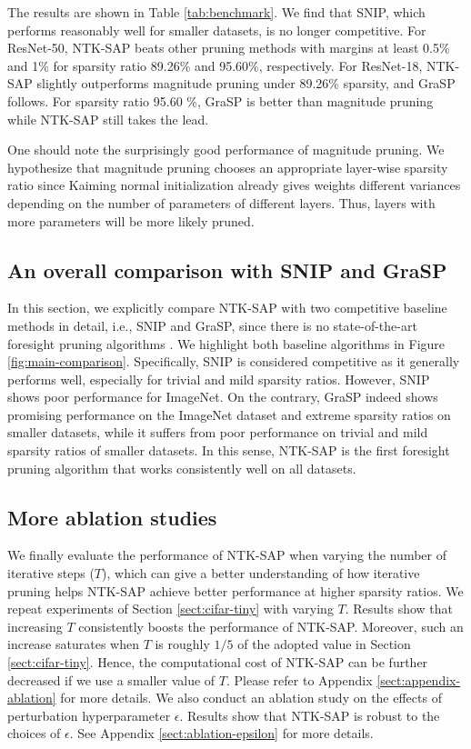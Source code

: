 \documentclass{article} %
\begin{document}
The results are shown in Table \ref{tab:benchmark}. We find that SNIP, which performs reasonably well for smaller datasets, is no longer competitive. For ResNet-50, NTK-SAP beats other pruning methods with margins at least 0.5\% and 1\% for sparsity ratio 89.26\% and 95.60\%, respectively. For ResNet-18, NTK-SAP slightly outperforms magnitude pruning under 89.26\% sparsity, and GraSP follows. For sparsity ratio 95.60 \%, GraSP is better than magnitude pruning while NTK-SAP still takes the lead.


One should note the surprisingly good performance of magnitude pruning. We hypothesize that magnitude pruning chooses an appropriate layer-wise sparsity ratio since Kaiming normal initialization already gives weights different variances depending on the number of parameters of different layers. Thus, layers with more parameters will be more likely pruned. 

\subsection{An overall comparison with SNIP and GraSP}

In this section, we explicitly compare NTK-SAP with two competitive baseline methods in detail, i.e., SNIP and GraSP, since there is no state-of-the-art foresight pruning algorithms \citep{franklemissing}. We highlight both baseline algorithms in Figure \ref{fig:main-comparison}. Specifically, SNIP is considered competitive as it generally performs well, especially for trivial and mild sparsity ratios. However, SNIP shows poor performance for ImageNet. On the contrary, GraSP indeed shows promising performance on the ImageNet dataset and extreme sparsity ratios on smaller datasets, while it suffers from poor performance on trivial and mild sparsity ratios of smaller datasets. In this sense, NTK-SAP is the first foresight pruning algorithm that works consistently well on all datasets.

\subsection{More ablation studies} \label{sect:ablation-T}
We finally evaluate the performance of NTK-SAP when varying the number of iterative steps ($T$), which can give a better understanding of how iterative pruning helps NTK-SAP achieve better performance at higher sparsity ratios. We repeat experiments of Section \ref{sect:cifar-tiny} with varying $T$. Results show that increasing $T$ consistently boosts the performance of NTK-SAP. Moreover, such an increase saturates when $T$ is roughly $1/5$ of the adopted value in Section \ref{sect:cifar-tiny}. Hence, the computational cost of NTK-SAP can be further decreased if we use a smaller value of $T$. Please refer to Appendix \ref{sect:appendix-ablation} for more details. We also conduct an ablation study on the effects of perturbation hyperparameter $\epsilon$. Results show that NTK-SAP is robust to the choices of $\epsilon$. See Appendix \ref{sect:ablation-epsilon} for more details.
\end{document}
